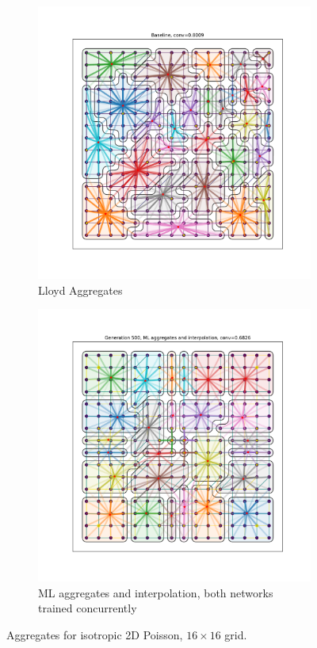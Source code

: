 \documentclass{article}
\begin{document}
\begin{figure}[h]
  \centering
  \begin{subfigure}[t]{0.49\textwidth}
    \centering
    \includegraphics[width=\textwidth]{baseline.pdf}
    \caption{Lloyd Aggregates}
  \end{subfigure}
  \hfill
  \begin{subfigure}[t]{0.49\textwidth}
    \centering
    \includegraphics[width=\textwidth]{full.pdf}
    \caption{ML aggregates and interpolation, both networks trained concurrently}
  \end{subfigure}
    \caption{Aggregates for isotropic 2D Poisson, $16 \times 16$ grid.}
\end{figure}
\end{document}
